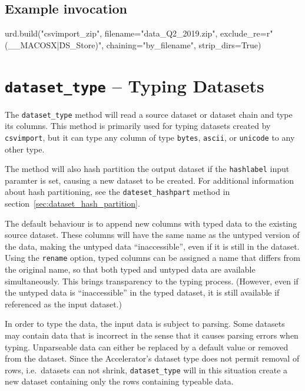 \subsection{Example invocation}

\begin{python}
urd.build("csvimport_zip",
    filename="data_Q2_2019.zip",
    exclude_re=r"(__MACOSX|\.DS_Store)",
    chaining="by_filename",
    strip_dirs=True)
\end{python}



\clearpage
\section{\texttt{dataset\_type} -- Typing Datasets}
The \texttt{dataset\_type} method will read a source dataset or
dataset chain and type its columns.  This method is primarily used for
typing datasets created by \texttt{csvimport}, but it can type any
column of type \texttt{bytes}, \texttt{ascii}, or \texttt{unicode} to
any other type.

The method will also hash partition the output dataset if the
\texttt{hashlabel} input paramter is set, causing a new dataset to be
created.  For additional information about hash partitioning, see the
\texttt{dateset\_hashpart} method in section~\ref{sec:dataset_hash_partition}.

The default behaviour is to append new columns with typed data to the
existing source dataset.  These columns will have the same name as the
untyped version of the data, making the untyped data ``inaccessible'',
even if it is still in the dataset.  Using the \texttt{rename} option,
typed columns can be assigned a name that differs from the original
name, so that both typed and untyped data are available
simultaneously.  This brings transparency to the typing process.
(However, even if the untyped data is ``inaccessible'' in the typed
dataset, it is still available if referenced as the input dataset.)

In order to type the data, the input data is subject to parsing.  Some
datasets may contain data that is incorrect in the sense that it
causes parsing errors when typing.  Unparseable data can either be
replaced by a default value or removed from the dataset.  Since the
Accelerator's dataset type does not permit removal of rows,
i.e.\ datasets can not shrink, \texttt{dataset\_type} will in this
situation create a new dataset containing only the rows containing
typeable data.

